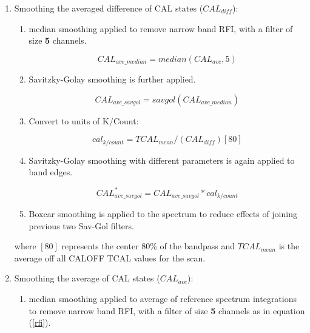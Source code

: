 \documentclass[11pt]{article}
\begin{document}
\begin{enumerate}

\item Smoothing the averaged difference of CAL states ($CAL_{diff}$):

\begin{enumerate}
\item median smoothing applied to remove narrow band RFI, with a filter of size {\bf 5} channels.


\begin{equation}\label{rfi}
CAL_{ave\_median} = median(CAL_{ave},5)
\end{equation}

\item Savitzky-Golay smoothing is further applied.

\begin{equation}\label{sg1}
CAL_{ave\_savgol} = savgol(CAL_{ave\_median})
\end{equation}

\item Convert to units of K/Count:

\begin{equation}\label{kcount}
cal_{k/count} = TCAL_{mean} / (CAL_{diff})[80]
\end{equation}

\item Savitzky-Golay smoothing with different parameters is again applied to band edges.

\begin{equation}\label{sg2}
CAL^{*}_{ave\_savgol} = CAL_{ave\_savgol} * cal_{k/count}
\end{equation}

\item Boxcar smoothing is applied to the spectrum to reduce effects of joining previous two Sav-Gol filters.

\end{enumerate}

where $[80]$ represents the center 80\% of the bandpass and $TCAL_{mean}$ is the average off all CALOFF TCAL values for the scan.

\item Smoothing the average of CAL states ($CAL_{ave}$):
\begin{enumerate}

\item median smoothing applied to average of reference spectrum integrations to remove narrow band RFI, with a filter of size {\bf 5} channels as in equation (\ref{rfi}).


\end{enumerate}
\end{enumerate}
\end{document}
